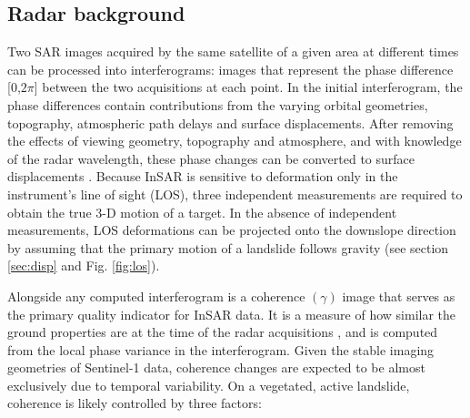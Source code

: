 \documentclass[nhess, manuscript]{copernicus}
\begin{document}
\subsection{Radar background}
\par
Two SAR images acquired by the same satellite of a given area at different times can be processed into interferograms: images that represent the phase difference [0,$2\pi$] between the two acquisitions at each point. In the initial interferogram, the phase differences contain contributions from the varying orbital geometries, topography, atmospheric path delays and surface displacements. After removing the effects of viewing geometry, topography and atmosphere, and with knowledge of the radar wavelength, these phase changes can be converted to surface displacements \citep[e.g.,][]{massonnet1998, rosen2000, wasowski2014}. Because InSAR is sensitive to deformation only in the instrument's line of sight (LOS), three independent measurements are required to obtain the true 3-D motion of a target. In the absence of independent measurements, LOS deformations can be projected onto the downslope direction by assuming that the primary motion of a landslide follows gravity (see section \ref{sec:disp} and Fig. \ref{fig:los}).     
\par  
Alongside any computed interferogram is a coherence $(\gamma)$ image that serves as the primary quality indicator for InSAR data. It is a measure of how similar the ground properties are at the time of the radar acquisitions \citep{scott2017, zebker1992}, and is computed from the local phase variance in the interferogram. Given the stable imaging geometries of Sentinel-1 data, coherence changes are expected to be almost exclusively due to temporal variability. On a vegetated, active landslide, coherence is likely controlled by three factors: \par
\end{document}

